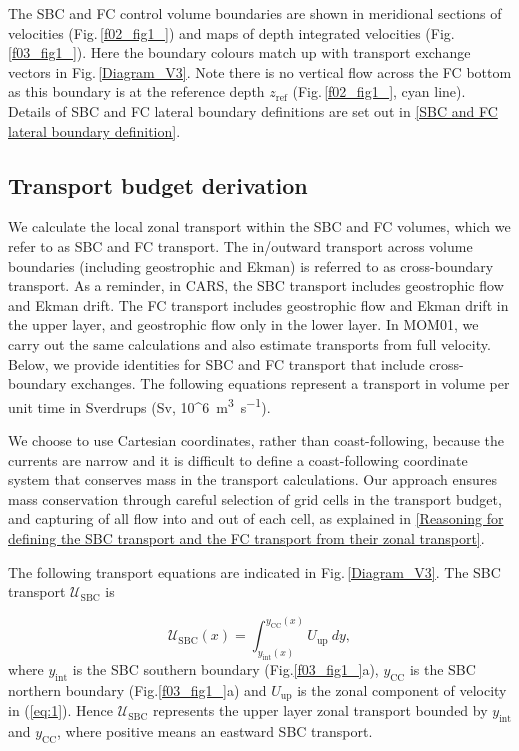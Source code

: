\documentclass[preprint,3p,review,12pt]{elsarticle}
\newcommand{\sub}[1]{_{\text{#1}}}
\begin{document}
The SBC and FC control volume boundaries are shown in meridional sections of velocities (Fig.\,\ref{f02_fig1_}) and maps of depth integrated velocities (Fig.\,\ref{f03_fig1_}). Here the boundary colours match up with transport exchange vectors in Fig.\,\ref{Diagram_V3}. Note there is no vertical flow across the FC bottom as this boundary is at the reference depth $z\sub{ref}$ (Fig.\,\ref{f02_fig1_}, cyan line). Details of SBC and FC lateral boundary definitions are set out in \ref{SBC and FC lateral boundary definition}.

\subsection{Transport budget derivation} \label{Transport budget derivation}
We calculate the local zonal transport within the SBC and FC volumes,
which we refer to as SBC and FC transport. The in/outward transport across volume boundaries (including geostrophic and Ekman) is referred to as cross-boundary transport. As a reminder, in CARS, the SBC transport includes geostrophic flow and Ekman drift. The FC transport includes geostrophic flow and Ekman drift in the upper layer, and geostrophic flow only in the lower layer. In MOM01, we carry out the same calculations and also estimate transports from full velocity.
Below, we provide identities for SBC and FC transport that include cross-boundary exchanges. The following equations represent a transport in volume per unit time in Sverdrups (\si{Sv},  \SI[parse-numbers=false]{10^6}{\cubic\meter\per\second}).

We choose to use Cartesian coordinates, rather than coast-following, because the currents are narrow and it is difficult to define a coast-following coordinate system that conserves mass in the transport calculations. Our approach ensures mass conservation through careful selection of grid cells in the transport budget, and capturing of all flow into and out of each cell, as explained in \ref{Reasoning for defining the SBC transport and the FC transport from their zonal transport}.

The following transport equations are indicated in Fig.\,\ref{Diagram_V3}. The SBC transport $\mathcal{U}\sub{SBC}$ is 

\begin{equation} \label{eq:3}
\mathcal{U}\sub{SBC}(x) = \int_{y\sub{int}(x)}^{y\sub{CC}(x)}{U}\sub{up}\ dy,
\end{equation}
%
where $y\sub{int}$ is the SBC southern boundary (Fig.\ref{f03_fig1_}a), $y\sub{CC}$ is the SBC northern boundary (Fig.\ref{f03_fig1_}a) and $U\sub{up}$ is the zonal component of velocity in (\ref{eq:1}). Hence $\mathcal{U}\sub{SBC}$ represents the upper layer zonal transport bounded by $y\sub{int}$ and $y\sub{CC}$, where positive means an eastward SBC transport. 
\end{document}
